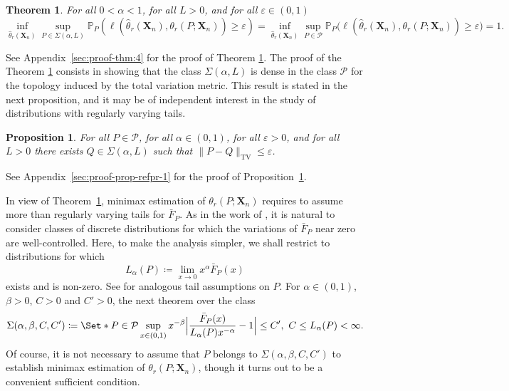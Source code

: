\documentclass{article}
\newtheorem{theorem}{Theorem}
\newtheorem{proposition}{Proposition}
\newcommand{\1}{\boldsymbol{1}}
\newcommand{\PP}{\mathbb{P}}
\providecommand\given{} %
\theoremstyle{plain}
\begin{document}
\begin{theorem}
  \label{thm:4}
  For all $0 < \alpha < 1$, for all $L > 0$, and for all $\varepsilon \in (0,1)$
  \begin{equation*}
    \inf_{\hat{\theta}_r(\mathbf{X}_{n})}\sup_{P\in \Sigma(\alpha,L)}\PP_P\left(\ell(\hat{\theta}_r(\mathbf{X}_{n}),\theta_r(P;\mathbf{X}_{n})) \geq \varepsilon \right)
    = \inf_{\hat{\theta}_r(\mathbf{X}_{n})}\sup_{P\in \mathcal{P}}\PP_P\Big(\ell(\hat{\theta}_r(\mathbf{X}_{n}),\theta_r(P;\mathbf{X}_{n})) \geq \varepsilon \Big) =1.
  \end{equation*}
\end{theorem}

See Appendix~\ref{sec:proof-thm:4} for the proof of Theorem \ref{thm:4}. The proof of the Theorem \ref{thm:4} consists in showing that the class $\Sigma(\alpha,L)$ is dense in the class $\mathcal{P}$ for the topology induced by the total variation metric. This result is stated in the next proposition, and it may be of independent interest in the study of distributions with regularly varying tails.

\begin{proposition}
  \label{pro:1}
  For all $P \in \mathcal{P}$, for all $\alpha \in (0,1)$, for all $\varepsilon > 0$, and for all $L> 0$ there exists $Q \in \Sigma(\alpha,L)$ such that $\|P - Q\|_{\mathrm{TV}} \leq \varepsilon$.
\end{proposition}
See Appendix~\ref{sec:proof-prop-refpr-1} for the proof of Proposition~\ref{pro:1}.

In view of Theorem~\ref{thm:4}, minimax estimation of $\theta_r(P;\mathbf{X}_n)$ requires to assume more than  regularly varying tails for $\bar{F}_P$. As in the work of \cite{Fav(22)}, it is natural to consider classes of discrete distributions for which the variations of $\bar{F}_P$ near zero are well-controlled. Here, to make the analysis simpler, we shall restrict to distributions for which
\begin{displaymath}
  L_{\alpha}(P) \coloneqq \lim_{x\to 0}x^{\alpha}\bar{F}_P(x)  
\end{displaymath}
exists and is non-zero. See \cite{Fav(22)} for analogous tail assumptions on $P$. For $\alpha \in (0,1)$, $\beta > 0$, $C>0$ and $C' > 0$, the next theorem over the class
\begin{displaymath}
 \Sigma(\alpha,\beta,C,C')%
  \coloneqq%
  \Set*{P \in \mathcal{P} \given \sup_{x \in (0,1)}x^{-\beta}\Big|\frac{\bar{F}_P(x)}{L_{\alpha}(P)x^{-\alpha}} - 1  \Big| \leq C',\ C\leq  L_{\alpha}(P) < \infty   }.
\end{displaymath}
Of course, it is not necessary to assume that $P$ belongs to $\Sigma(\alpha,\beta,C,C')$ to establish minimax estimation of $\theta_r(P;\mathbf{X}_n)$, though it turns out to be a convenient sufficient condition.
\end{document}
